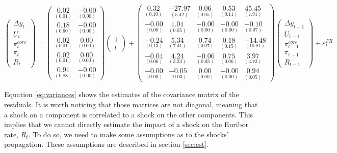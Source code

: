 \documentclass[
  11pt,
]{article}
\begin{document}
\begin{equation}
\begin{pmatrix}
 \Delta y_{t} \\
U_{t} \\
\pi^{core}_{t} \\
\pi_{t} \\
R_{t} 
\end{pmatrix} = \begin{pmatrix}
 \underset{(0.01)}{0.02} & \underset{(0.00)}{-0.00} \\
\underset{(0.60)}{0.18} & \underset{(0.00)}{-0.00} \\
\underset{(0.01)}{0.02} & \underset{(0.00)}{0.00} \\
\underset{(0.01)}{0.02} & \underset{(0.00)}{0.00} \\
\underset{(0.88)}{0.91} & \underset{(0.00)}{-0.00} 
\end{pmatrix} \begin{pmatrix} 1 \\ t \end{pmatrix}+\begin{pmatrix}
 \underset{(0.10)}{0.32} & \underset{(5.42)}{-27.97} & \underset{(0.05)}{0.06} & \underset{(0.11)}{0.53} & \underset{(7.91)}{45.45} \\
\underset{(0.00)}{-0.00} & \underset{(0.05)}{1.01} & \underset{(0.00)}{-0.00} & \underset{(0.00)}{-0.00} & \underset{(0.07)}{-0.10} \\
\underset{(0.13)}{-0.24} & \underset{(7.41)}{5.34} & \underset{(0.07)}{0.74} & \underset{(0.15)}{0.18} & \underset{(10.81)}{-14.48} \\
\underset{(0.06)}{-0.04} & \underset{(3.23)}{4.24} & \underset{(0.03)}{-0.06} & \underset{(0.06)}{0.75} & \underset{(4.72)}{3.97} \\
\underset{(0.00)}{-0.00} & \underset{(0.03)}{-0.05} & \underset{(0.00)}{0.00} & \underset{(0.00)}{-0.00} & \underset{(0.05)}{0.94} 
\end{pmatrix} \begin{pmatrix}
 \Delta y_{t - 1} \\
U_{t - 1} \\
\pi^{core}_{t - 1} \\
\pi_{t - 1} \\
R_{t - 1} 
\end{pmatrix}+ \varepsilon^{FR}_t
\label{eq:var-fr}
\end{equation}

Equation \eqref{eq:variances} shows the estimates of the covariance matrix of the residuals.
It is worth noticing that those matrices are not diagonal, meaning that a shock on a component is correlated to a shock on the other components.
This implies that we cannot directly estimate the impact of a shock on the Euribor rate, \(R_t\).
To do so, we need to make some assumptions as to the shocks' propagation. These assumptions are described in section \ref{sec:est}.
\end{document}

